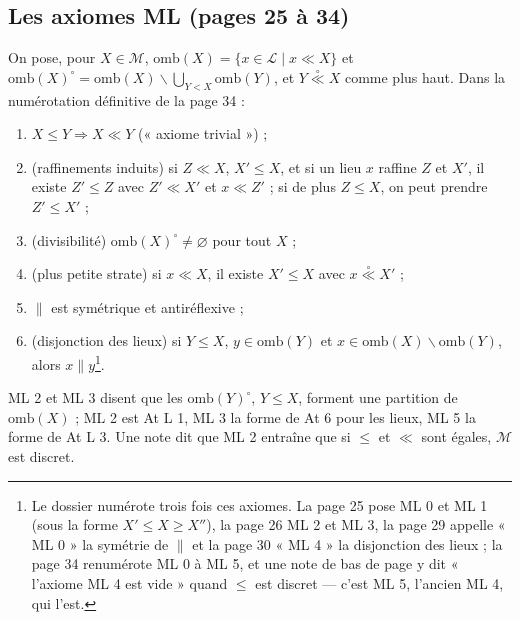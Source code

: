 \documentclass[11pt,a4paper]{article}
\begin{document}
\subsection*{Les axiomes ML (pages 25 à 34)}

On pose, pour $X \in \mathcal{M}$, $\mathrm{omb}(X) = \{x \in \mathcal{L} \mid x
\ll X\}$ et $\mathrm{omb}(X)^{\circ} = \mathrm{omb}(X) \smallsetminus \bigcup_{Y
< X} \mathrm{omb}(Y)$, et $Y \mathrel{\overset{\circ}{\ll}} X$ comme plus haut.
Dans la numérotation définitive de la page 34 :
\begin{enumerate}
\item[\textbf{ML 0}] $X \leq Y \Rightarrow X \ll Y$ (« axiome trivial ») ;
\item[\textbf{ML 1}] (raffinements induits) si $Z \ll X$, $X' \leq X$, et si un
lieu $x$ raffine $Z$ et $X'$, il existe $Z' \leq Z$ avec $Z' \ll X'$ et $x \ll
Z'$ ; si de plus $Z \leq X$, on peut prendre $Z' \leq X'$ ;
\item[\textbf{ML 2}] (divisibilité) $\mathrm{omb}(X)^{\circ} \neq \varnothing$
pour tout $X$ ;
\item[\textbf{ML 3}] (plus petite strate) si $x \ll X$, il existe $X' \leq X$ avec
$x \mathrel{\overset{\circ}{\ll}} X'$ ;
\item[\textbf{ML 4}] $\parallel$ est symétrique et antiréflexive ;
\item[\textbf{ML 5}] (disjonction des lieux) si $Y \leq X$, $y \in
\mathrm{omb}(Y)$ et $x \in \mathrm{omb}(X) \smallsetminus \mathrm{omb}(Y)$, alors
$x \parallel y$\footnote{Le dossier numérote trois fois ces axiomes. La page 25
pose ML 0 et ML 1 (sous la forme $X' \leq X \geq X''$), la page 26 ML 2 et ML 3,
la page 29 appelle « ML 0 » la symétrie de $\parallel$ et la page 30 « ML 4 » la
disjonction des lieux ; la page 34 renumérote ML 0 à ML 5, et une note de bas
de page y dit « l'axiome ML 4 est vide » quand $\leq$ est discret --- c'est ML 5,
l'ancien ML 4, qui l'est.}.
\end{enumerate}
ML 2 et ML 3 disent que les $\mathrm{omb}(Y)^{\circ}$, $Y \leq X$, forment une
partition de $\mathrm{omb}(X)$ ; ML 2 est At L 1, ML 3 la forme de At 6 pour les
lieux, ML 5 la forme de At L 3. Une note dit que ML 2 entraîne que si $\leq$ et
$\ll$ sont égales, $\mathcal{M}$ est discret.
\end{document}
